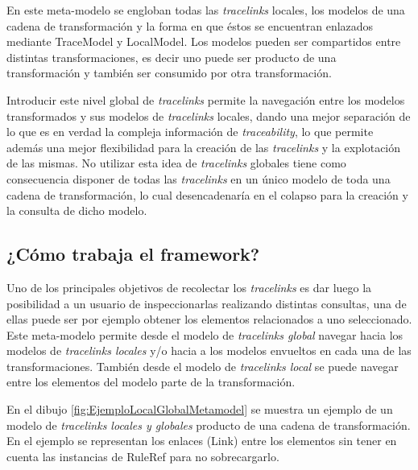 \documentclass[a4paper,12pt,twoside,spanish,openright]{book}
\begin{document}
En este meta-modelo se engloban todas las \textit{tracelinks} locales, los modelos de una cadena de transformación y la forma en que éstos se encuentran enlazados mediante \textsf{TraceModel} y \textsf{LocalModel}. Los modelos pueden ser compartidos entre distintas transformaciones, es decir uno puede ser producto de una transformación y también ser consumido por otra transformación.

Introducir este nivel global de \textit{tracelinks} permite la navegación entre los modelos transformados y sus modelos de \textit{tracelinks} locales, dando una mejor separación de lo que es en verdad la compleja información de \textit{traceability}, lo que permite además una mejor flexibilidad para la creación de las \textit{tracelinks} y la explotación de las mismas. No utilizar esta idea de \textit{tracelinks} globales tiene como consecuencia disponer de todas las \textit{tracelinks} en un único modelo de toda una cadena de transformación, lo cual desencadenaría en el colapso para la creación y la consulta de dicho modelo.

\subsection{¿Cómo trabaja el framework?}

Uno de los principales objetivos de recolectar los \textit{tracelinks} es dar luego la posibilidad a un usuario de inspeccionarlas realizando distintas consultas, una de ellas puede ser por ejemplo obtener los elementos relacionados a uno seleccionado. Este meta-modelo permite desde el modelo de \textit{tracelinks global} navegar hacia los modelos de \textit{tracelinks locales} y/o hacia a los modelos envueltos en cada una de las transformaciones. También desde el modelo de \textit{tracelinks local} se puede navegar entre los elementos del modelo parte de la transformación.

En el dibujo \ref{fig:EjemploLocalGlobalMetamodel} se muestra un ejemplo de un modelo de \textit{tracelinks locales y globales} producto de una cadena de transformación. En el ejemplo se representan los enlaces (\textsf{Link}) entre los elementos sin tener en cuenta las instancias de \textsf{RuleRef} para no sobrecargarlo.
\end{document}
